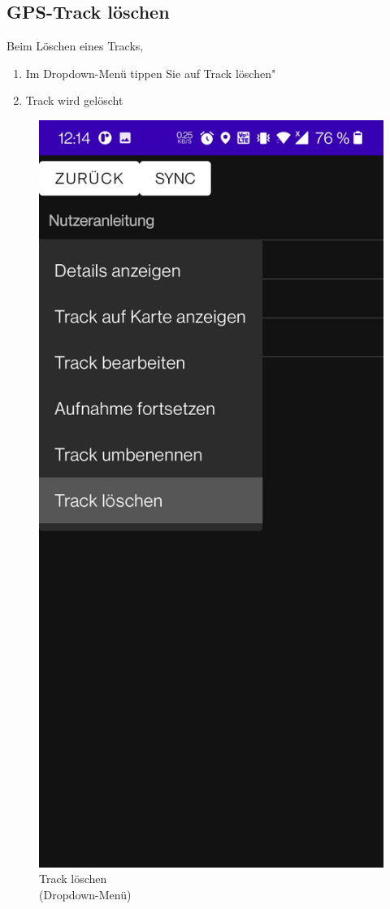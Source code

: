 \documentclass{article}
\begin{document}
\subsection{GPS-Track löschen}
	Beim Löschen eines Tracks,
	\begin{enumerate}
		\item Im Dropdown-Menü tippen Sie auf \glqq Track löschen"
		\item Track wird gelöscht
	\end{enumerate}
	\begin{figure}[H]
		\captionsetup{justification=centering}
		\includegraphics[scale=0.15]{13_loeschen.jpg}
		\centering
		\caption{Track löschen \\(Dropdown-Menü)}
	\end{figure}
\end{document}
